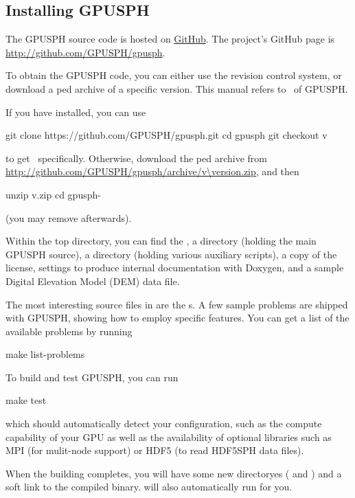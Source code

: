\documentclass{../GPUSPHtemplate}
\begin{document}
\subsection{Installing GPUSPH}

The GPUSPH source code is hosted on \href{http://github.com}{GitHub}.
The project's GitHub page is \url{http://github.com/GPUSPH/gpusph}.

To obtain the GPUSPH code, you can either use the  revision
control system, or download a ped archive of a specific
version. This manual refers to \currentver\ of GPUSPH.

If you have  installed, you can use
\begin{shellcode}[escapeinside=\{\}]
git clone https://github.com/GPUSPH/gpusph.git
cd gpusph
git checkout v{\version}
\end{shellcode}
to get \currentver\ specifically. Otherwise, download the ped
archive from \url{http://github.com/GPUSPH/gpusph/archive/v\version.zip},
and then
\begin{shellcode}[escapeinside=\{\}]
unzip v{\version}.zip
cd gpusph-{\version}
\end{shellcode}
(you may remove \version{} afterwards).

Within the top directory, you can find the , a 
directory (holding the main GPUSPH source), a  directory
(holding various auxiliary scripts), a copy of the license, settings to
produce internal documentation with Doxygen, and a sample Digital
Elevation Model (DEM) data file.

The most interesting source files in  are the s.
A few sample problems are shipped with GPUSPH, showing how to employ
specific features. You can get a list of the available problems by
running
\begin{shellcode}
make list-problems
\end{shellcode}

To build and test GPUSPH, you can run
\begin{shellcode}
make test
\end{shellcode}
which should automatically detect your configuration, such as the
compute capability of your GPU as well as the availability of optional
libraries such as MPI (for mulit-node support) or HDF5 (to read HDF5SPH
data files).

When the building completes, you will have some new directoryes
( and ) and a  soft link to the
compiled binary.  will also automatically run
 for you.
\end{document}
